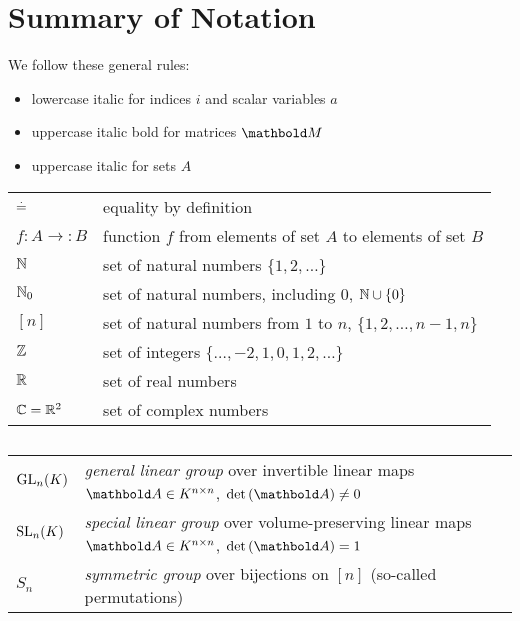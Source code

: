 
\chapter{Summary of Notation}

\begin{fullwidth}
We follow these general rules: \begin{itemize}[noitemsep]
    \item lowercase italic for indices $i$ and scalar variables $a$
    \item uppercase italic bold for matrices $\mM$
    \item uppercase italic for sets $A$
\end{itemize}

\emptyparagraph\begin{tabular}{p{2cm}l}
    $\overset{.}{=}$ & equality by definition \\
    $f : A \to : B$ & function $f$ from elements of set $A$ to elements of set $B$ \\
    $\mathbb{N}$ & set of natural numbers $\{1, 2, \dots\}$ \\
    $\mathbb{N}_0$ & set of natural numbers, including $0$, $\mathbb{N} \cup \{0\}$ \\
    $[n]$ & set of natural numbers from $1$ to $n$, $\{1, 2, \dots, n-1, n\}$ \\
    $\mathbb{Z}$ & set of integers $\{\dots, -2, 1, 0, 1, 2, \dots\}$ \\
    $\mathbb{R}$ & set of real numbers \\
    $\mathbb{C} = \mathbb{R}^2$ & set of complex numbers \\
\end{tabular}

\section*{}
\emptyparagraph\begin{tabular}{p{2cm}l}
    $\mathrm{GL}_{n}(K)$ & \emph{general linear group} over invertible linear maps $\mA \in K^{n \times n}$, $\determ{\mA} \neq 0$ \\
    $\mathrm{SL}_{n}(K)$ & \emph{special linear group} over volume-preserving linear maps $\mA \in K^{n \times n}$, $\determ{\mA} = 1$ \\
    $S_n$ & \emph{symmetric group} over bijections on $[n]$ (so-called permutations) \\
\end{tabular}
\end{fullwidth}
